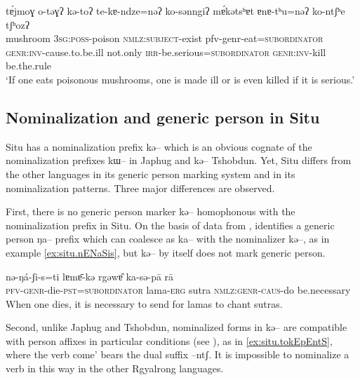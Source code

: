 \documentclass[oldfontcommands,oneside,a4paper,11pt]{article}
\newcommand{\ipa}[1]{{\phon \mbox{#1}}} %
\begin{document}
 \begin{exe}
\ex \label{ex:tshobdun.inv}
\gll
\ipa{tɐ́jmoɣ}  	\ipa{o-təɣʔ}  	\ipa{kə-toʔ}  	\ipa{te-kɐ-ndze=nəʔ}  	\ipa{ko-sənngiʔ}  	\ipa{mɐ́kətsʰɐt}  	\ipa{ɐnɐ-tʰu=nəʔ}  	\ipa{ko-ntʃʰe}  	\ipa{tʃʰozʔ}  \\
 mushroom \textsc{3sg:poss}-poison \textsc{nmlz:subject}-exist pfv-genr-eat=\textsc{subordinator}  \textsc{genr:inv}-cause.to.be.ill not.only \textsc{irr}-be.serious=\textsc{subordinator}   \textsc{genr:inv}-kill be.the.rule \\
\glt ‘If one eats poisonous mushrooms, one is made ill or is even killed if it is serious.’ 
 \end{exe}
 
 
\subsection{Nominalization and generic person in Situ} \label{situ.nmlz}

   Situ has a nominalization prefix \ipa{kə--} which is an obvious cognate of the  nominalization prefixes \ipa{kɯ--} in    Japhug   and \ipa{kə--} Tshobdun. Yet, Situ differs from the other languages in its generic person marking system and in its nominalization patterns. Three major differences are observed.

First, there is no generic person  marker \ipa{kə--} homophonous with the nominalization prefix in Situ.  On the basis of data from \citet[47-9]{wei01ka}, \citet[243-4]{sun14generic} identifies a generic person \ipa{ŋa--} prefix which can coalesce as \ipa{ka--} with the nominalizer \ipa{kə--}, as in example \ref{ex:situ.nENaSis}, but \ipa{kə--} by itself does not mark generic person. 

 \begin{exe}
\ex \label{ex:situ.nENaSis}
\gll
\ipa{nə-ŋá-ʃi-s=ti}  	\ipa{lɐmɐ̄-kə}  	\ipa{rgəwɐ̂}  	\ipa{ka-sə-pā}  	\ipa{rā}  \\
\textsc{pfv-genr}-die-\textsc{pst=subordinator} lama-\textsc{erg} sutra \textsc{nmlz:genr-caus}-do be.necessary \\
\glt When one dies, it is necessary to send for lamas to chant sutras.
  \end{exe}
 
Second, unlike Japhug and Tshobdun, nominalized forms in \ipa{kə--} are compatible with person affixes in particular conditions (see \citealt[11-12]{jacksonlin07}), as in \ref{ex:situ.tokEpEntS}, where the verb  come' bears the dual suffix \ipa{--ntʃ}. It is impossible to nominalize a verb in this way in the other Rgyalrong languages.
\end{document}
